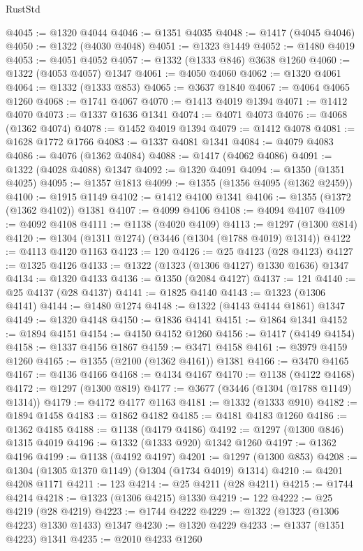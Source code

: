 \begin{lexlean}{RustStd}
\begin{coremodule}
@4045 := @1320 @4044
@4046 := @1351 @4035
@4048 := @1417 (@4045 @4046)
@4050 := @1322 (@4030 @4048)
@4051 := @1323 @1449
@4052 := @1480 @4019
@4053 := @4051 @4052
@4057 := @1332 (@1333 @846) @3638 @1260
@4060 := @1322 (@4053 @4057) @1347
@4061 := @4050 @4060
@4062 := @1320 @4061
@4064 := @1332 (@1333 @853)
@4065 := @3637 @1840
@4067 := @4064 @4065 @1260
@4068 := @1741 @4067
@4070 := @1413 @4019 @1394
@4071 := @1412 @4070
@4073 := @1337 @1636 @1341
@4074 := @4071 @4073
@4076 := @4068 (@1362 @4074)
@4078 := @1452 @4019 @1394
@4079 := @1412 @4078
@4081 := @1628 @1772 @1766
@4083 := @1337 @4081 @1341
@4084 := @4079 @4083
@4086 := @4076 (@1362 @4084)
@4088 := @1417 (@4062 @4086)
@4091 := @1322 (@4028 @4088) @1347
@4092 := @1320 @4091
@4094 := @1350 (@1351 @4025)
@4095 := @1357 @1813
@4099 := @1355 (@1356 @4095 (@1362 @2459))
@4100 := @1915 @1149
@4102 := @1412 @4100 @1341
@4106 := @1355 (@1372 (@1362 @4102)) @1381
@4107 := @4099 @4106
@4108 := @4094 @4107
@4109 := @4092 @4108
@4111 := @1138 (@4020 @4109)
@4113 := @1297 (@1300 @814)
@4120 := @1304 (@1311 @1274) (@3446 (@1304 (@1788 @4019) @1314))
@4122 := @4113 @4120 @1163
@4123 := 120
@4126 := @25 @4123 (@28 @4123)
@4127 := @1325 @4126
@4133 := @1322 (@1323 (@1306 @4127) @1330 @1636) @1347
@4134 := @1320 @4133
@4136 := @1350 (@2084 @4127)
@4137 := 121
@4140 := @25 @4137 (@28 @4137)
@4141 := @1825 @4140
@4143 := @1323 (@1306 @4141)
@4144 := @1480 @1274
@4148 := @1322 (@4143 @4144 @1861) @1347
@4149 := @1320 @4148
@4150 := @1836 @4141
@4151 := @1864 @1341
@4152 := @1894 @4151
@4154 := @4150 @4152 @1260
@4156 := @1417 (@4149 @4154)
@4158 := @1337 @4156 @1867
@4159 := @3471 @4158
@4161 := @3979 @4159 @1260
@4165 := @1355 (@2100 (@1362 @4161)) @1381
@4166 := @3470 @4165
@4167 := @4136 @4166
@4168 := @4134 @4167
@4170 := @1138 (@4122 @4168)
@4172 := @1297 (@1300 @819)
@4177 := @3677 (@3446 (@1304 (@1788 @1149) @1314))
@4179 := @4172 @4177 @1163
@4181 := @1332 (@1333 @910)
@4182 := @1894 @1458
@4183 := @1862 @4182
@4185 := @4181 @4183 @1260
@4186 := @1362 @4185
@4188 := @1138 (@4179 @4186)
@4192 := @1297 (@1300 @846) @1315 @4019
@4196 := @1332 (@1333 @920) @1342 @1260
@4197 := @1362 @4196
@4199 := @1138 (@4192 @4197)
@4201 := @1297 (@1300 @853)
@4208 := @1304 (@1305 @1370 @1149) (@1304 (@1734 @4019) @1314)
@4210 := @4201 @4208 @1171
@4211 := 123
@4214 := @25 @4211 (@28 @4211)
@4215 := @1744 @4214
@4218 := @1323 (@1306 @4215) @1330
@4219 := 122
@4222 := @25 @4219 (@28 @4219)
@4223 := @1744 @4222
@4229 := @1322 (@1323 (@1306 @4223) @1330 @1433) @1347
@4230 := @1320 @4229
@4233 := @1337 (@1351 @4223) @1341
@4235 := @2010 @4233 @1260

\end{coremodule}
\end{lexlean}
